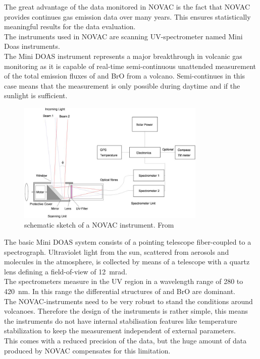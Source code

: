 		The great advantage of the data monitored in NOVAC is the fact that NOVAC provides continues gas emission data over many years. This ensures statistically meaningful results for the data evaluation.\\
		The instruments used in NOVAC are scanning UV-spectrometer named Mini Doas instruments. \\
		The  Mini DOAS  instrument  represents  a  major  breakthrough  in  volcanic  gas	monitoring as it is capable of real-time semi-continuous unattended measurement of the total emission fluxes of   and BrO from a volcano. Semi-continues in this case means that the measurement is only possible during daytime and if the sunlight is sufficient.\\
		\begin{figure}
			\centering
		 \includegraphics[width=0.8\textwidth]{Bilder/Simon/Bilder_Tung/NOVAC_Instrument}
			\caption{schematic sketch of a NOVAC instrument. From \cite{galle2010network}}
		\end{figure}
		The  basic  Mini DOAS  system  consists  of  a  pointing  telescope  fiber-coupled  to  a  spectrograph.  
		Ultraviolet light from the sun, scattered from aerosols and molecules in the atmosphere, is collected by 
		means  of  a  telescope  with  a  quartz  lens  defining  a  field-of-view  of  12~mrad.
		\cite{NOVACsite} \\
		The spectrometers measure in the UV region in a wavelength range of 280 to 420~nm. In this range the differential structures of  and BrO are dominant.\\
		The NOVAC-instruments need to be very robust to stand the conditions around volcanoes. Therefore the design of the instruments is rather simple, this means the instruments do not have internal stabilisation features like temperature stabilization to keep the measurement independent of external parameters.\\
		This comes with a reduced precision of the data, but the huge amount of data produced by NOVAC compensates for this limitation.  
		
